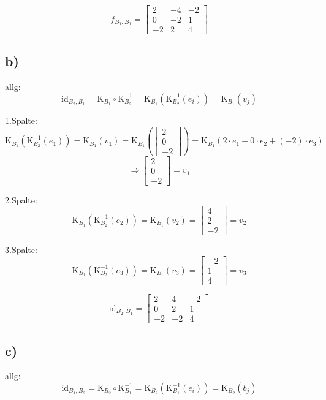 \documentclass[a4paper, 11pt]{article}
\begin{document}
$$f_{B_1,B_1} = \begin{bmatrix} 2 & -4 & -2 \\ 0 & -2 & 1 \\ -2 & 2 & 4 \end{bmatrix}$$

\subsection{b)}
\label{sec:org92cfec4}
allg:
$$\text{id}_{B_2,B_1} = \text{K}_{B_1} \circ \text{K}_{B_2}^{-1} = \text{K}_{B_1}(\text{K}_{B_2}^{-1}(e_i)) = \text{K}_{B_1}(v_j)$$

1.Spalte:
$$\text{K}_{B_1}(\text{K}_{B_2}^{-1}(e_1)) =  \text{K}_{B_1}(v_1) =  \text{K}_{B_1}\left(\begin{bmatrix} 2 \\ 0 \\ -2 \end{bmatrix}\right) = \text{K}_{B_1}(2 \cdot e_1 + 0 \cdot e_2 + (-2) \cdot e_3)$$
$$\Rightarrow \begin{bmatrix} 2 \\ 0 \\ -2 \end{bmatrix} = v_1$$

2.Spalte:
$$\text{K}_{B_1}(\text{K}_{B_2}^{-1}(e_2)) =  \text{K}_{B_1}(v_2) = \begin{bmatrix} 4 \\ 2 \\ -2 \end{bmatrix} = v_2$$

3.Spalte:
$$\text{K}_{B_1}(\text{K}_{B_2}^{-1}(e_3)) =  \text{K}_{B_1}(v_3) = \begin{bmatrix} -2 \\ 1 \\ 4 \end{bmatrix} = v_3$$

$$\text{id}_{B_2,B_1} = \begin{bmatrix} 2 & 4 & -2 \\ 0 & 2 & 1 \\ -2 & -2 & 4 \end{bmatrix}$$

\subsection{c)}
\label{sec:org07f7b46}
allg:
$$\text{id}_{B_1,B_2} = \text{K}_{B_2} \circ \text{K}_{B_1}^{-1} = \text{K}_{B_2}(\text{K}_{B_1}^{-1}(e_i)) = \text{K}_{B_2}(b_j)$$
\end{document}

